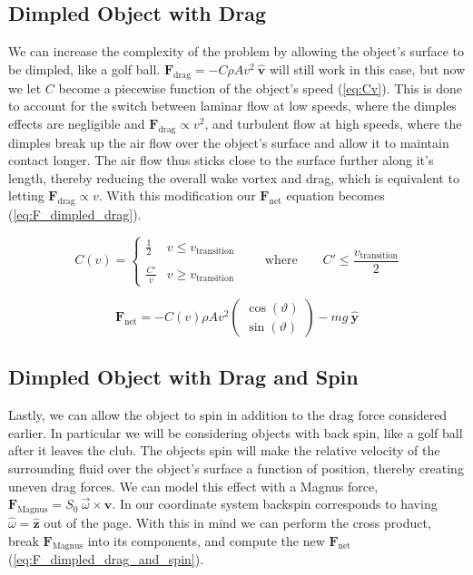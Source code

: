 \documentclass[notitlepage,aps,prd,nofootinbib]{revtex4-1}
\begin{document}
\subsection{Dimpled Object with Drag} \label{subsec:dimpled_drag}
We can increase the complexity of the problem by allowing the object's surface to be dimpled, like a golf ball. $\mathbf{F}_{\text{drag}} = - C \rho A v^{2}~\hat{\mathbf{v}}$ will still work in this case, but now we let $C$ become a piecewise function of the object's speed (\ref{eq:Cv}). This is done to account for the switch between laminar flow at low speeds, where the dimples effects are negligible and $\mathbf{F}_{\text{drag}} \propto v^{2}$, and turbulent flow at high speeds, where the dimples break up the air flow over the object's surface and allow it to maintain contact longer. The air flow thus sticks close to the surface further along it's length, thereby reducing the overall wake vortex and drag, which is equivalent to letting $\mathbf{F}_{\text{drag}} \propto v$. With this modification our $\mathbf{F}_{\text{net}}$ equation becomes (\ref{eq:F_dimpled_drag}).

\begin{equation} \label{eq:Cv}
C\left(v\right) =
  \begin{cases} 
    \frac{1}{2} & v \leq v_{\text{transition}} \\
    \\
    \frac{C'}{v} & v \geq v_{\text{transition}}
  \end{cases}
\qquad \text{where} \qquad
C' \leq \frac{v_{\text{transition}}}{2}
\end{equation}

\begin{equation} \label{eq:F_dimpled_drag}
\mathbf{F}_{\text{net}} = - C\left(v\right) \rho A v^{2}
\begin{pmatrix}
  \cos(\vartheta) \\
  \sin(\vartheta)
\end{pmatrix}
-m g~\hat{\mathbf{y}}
\end{equation}

\subsection{Dimpled Object with Drag and Spin} \label{subsec:dimpled_drag_spin}
Lastly, we can allow the object to spin in addition to the drag force considered earlier. In particular we will be considering objects with back spin, like a golf ball after it leaves the club. The objects spin will make the relative velocity of the surrounding fluid over the object's surface a function of position, thereby creating uneven drag forces. We can model this effect with a Magnus force, $\mathbf{F}_{\text{Magnus}} = S_{0}~\vec{\omega} \times \mathbf{v}$. In our coordinate system backspin corresponds to having $\hat{\omega} = \hat{\mathbf{z}}$ out of the page. With this in mind we can perform the cross product, break $\mathbf{F}_{\text{Magnus}}$ into its components, and compute the new $\mathbf{F}_{\text{net}}$ (\ref{eq:F_dimpled_drag_and_spin}).
\end{document}
